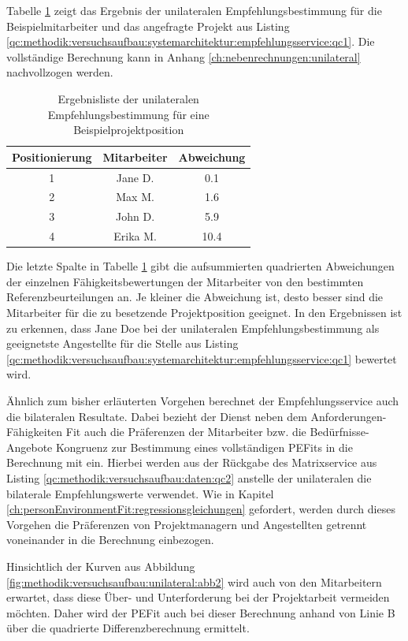 Tabelle \ref{tbl:methodik:versuchsaufbau:unilateral:tbl2} zeigt das Ergebnis der unilateralen Empfehlungsbestimmung für die Beispielmitarbeiter und das angefragte Projekt aus Listing \ref{qc:methodik:versuchsaufbau:systemarchitektur:empfehlungsservice:qc1}. Die vollständige Berechnung kann in Anhang \ref{ch:nebenrechnungen:unilateral} nachvollzogen werden.

\begin{table}[h]
	\centering
	\begin{tabular}{c|c|c}
		\textbf{Positionierung} & \textbf{Mitarbeiter} & \textbf{Abweichung}\\
		\hline
		1 & Jane D.  & 0.1\\
		2 & Max M.   & 1.6\\
		3 & John D.  & 5.9\\
		4 & Erika M. & 10.4
	\end{tabular}
	\caption{Ergebnisliste der unilateralen Empfehlungsbestimmung für eine Beispielprojektposition}
	\label{tbl:methodik:versuchsaufbau:unilateral:tbl2}
\end{table}
\newpage
Die letzte Spalte in Tabelle \ref{tbl:methodik:versuchsaufbau:unilateral:tbl2} gibt die aufsummierten quadrierten Abweichungen der einzelnen Fähigkeitsbewertungen der Mitarbeiter von den bestimmten Referenzbeurteilungen an. Je kleiner die Abweichung ist, desto besser sind die Mitarbeiter für die zu besetzende Projektposition geeignet. In den Ergebnissen ist zu erkennen, dass Jane Doe bei der unilateralen Empfehlungsbestimmung als geeignetste Angestellte für die Stelle aus Listing \ref{qc:methodik:versuchsaufbau:systemarchitektur:empfehlungsservice:qc1} bewertet wird.

Ähnlich zum bisher erläuterten Vorgehen berechnet der Empfehlungsservice auch die bilateralen Resultate. Dabei bezieht der Dienst neben dem Anforderungen-Fähigkeiten Fit auch die Präferenzen der Mitarbeiter bzw. die Bedürfnisse-Angebote Kongruenz zur Bestimmung eines vollständigen \acp{PEFit} in die Berechnung mit ein. Hierbei werden aus der Rückgabe des Matrixservice aus Listing \ref{qc:methodik:versuchsaufbau:daten:qc2} anstelle der unilateralen die bilaterale Empfehlungswerte verwendet. Wie in Kapitel \ref{ch:personEnvironmentFit:regressionsgleichungen} gefordert, werden durch dieses Vorgehen die Präferenzen von Projektmanagern und Angestellten getrennt voneinander in die Berechnung einbezogen.

Hinsichtlich der Kurven aus Abbildung \ref{fig:methodik:versuchsaufbau:unilateral:abb2} wird auch von den Mitarbeitern erwartet, dass diese Über- und Unterforderung bei der Projektarbeit vermeiden möchten. Daher wird der \ac{PEFit} auch bei dieser Berechnung anhand von Linie B über die quadrierte Differenzberechnung ermittelt.

